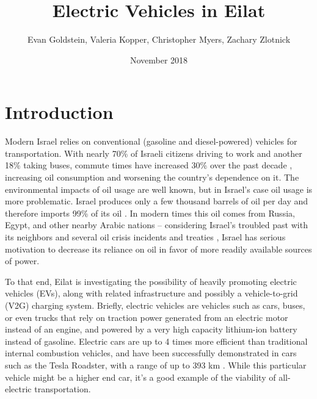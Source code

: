 \documentclass{article}                         %
\title{Electric Vehicles in Eilat}
\author{Evan Goldstein, Valeria Kopper, Christopher Myers, Zachary Zlotnick}
\date{November 2018}
\begin{document}
\maketitle
\newpage

\renewcommand\abstractname{Summary} %

\tableofcontents
\newpage
\listofauthorships
\newpage
{}
\doublespacing

\section{Introduction}

Modern Israel relies on conventional (gasoline and diesel-powered) vehicles for transportation. With nearly 70\% of Israeli citizens driving to work and another 18\% taking buses, commute times have increased 30\% over the past decade \cite{Dori2018IsraeliRoads}, increasing oil consumption and worsening the country's dependence on it. The environmental impacts of oil usage are well known, but in Israel's case oil usage is more problematic. Israel produces only a few thousand barrels of oil per day and therefore imports 99\% of its oil \cite{Engber2006WhereOil}. In modern times this oil comes from Russia, Egypt, and other nearby Arabic nations -- considering Israel's troubled past with its neighbors and several oil crisis incidents and treaties \cite{Engber2006WhereOil}, Israel has serious motivation to decrease its reliance on oil in favor of more readily available sources of power.

To that end, Eilat is investigating the possibility of heavily promoting electric vehicles (EVs), along with related infrastructure and possibly a vehicle-to-grid (V2G) charging system. Briefly, electric vehicles are vehicles such as cars, buses, or even trucks that rely on traction power generated from an electric motor instead of an engine, and powered by a very high capacity lithium-ion battery instead of gasoline. Electric cars are up to 4 times more efficient than traditional internal combustion vehicles, and have been successfully demonstrated in cars such as the Tesla Roadster, with a range of up to 393 km \cite{Friel2010ManagementVehicles}. While this particular vehicle might be a higher end car, it's a good example of the viability of all-electric transportation.
\end{document}

